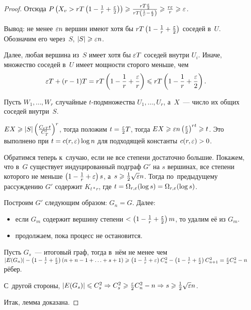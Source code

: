 \documentclass{article}
\begin{document}
\begin{proof}
	Отсюда $P\left(X_v > rT\left(1 - \frac{1}{r} + \frac{\varepsilon}{2}\right)\right)
	\geqslant \frac{rT \frac{\varepsilon}{2}}{rT \left(\frac{1}{r} - \frac{\varepsilon}{2}\right)}
	\geqslant \frac{r\varepsilon}{r} \geqslant \varepsilon$.

	Вывод: не менее $\varepsilon n$ вершин имеют хотя бы $rT\left(1 - \frac{1}{r} +
	\frac{\varepsilon}{2}\right)$ соседей в~$U$. Обозначим его через~$S$, $|S| \geqslant \varepsilon
	n$.

	Далее, любая вершина из~$S$ имеет хотя бы $\varepsilon T$ соседей внутри $U_i$.
	Иначе, множество соседей в~$U$ имеет мощности сторого меньше, чем
	$$ \varepsilon T + (r - 1) T = rT \left(1 - \frac{1}{r} + \frac{\varepsilon}{r}\right) \leqslant
	rT \left( 1 - \frac{1}{r} + \frac{\varepsilon}{2} \right).$$

	Пусть $W_1, \ldots, W_r$ случайные $t$-подмножества $U_1, \ldots, U_r$,
	а~$X$~--- число их общих соседей внутри~$S$.

	$ EX \geqslant |S| \left( \frac{C_{\varepsilon T}{t}}{C_T^t}\right)^r $, тогда положим $t =
	\frac{\varepsilon}{2}T$, тогда $EX \geqslant \varepsilon n \left(\frac{\varepsilon}{2}\right)^{rt} \geqslant
	t$. Это выполнено при $t = c(r, \varepsilon) \log n$ для подходящей константы $c(r,
	\varepsilon) > 0$.

	Обратимся теперь к~случаю, если не все степени достаточно большие. Покажем,
	что в~$G$ существует индуцированный подграф $G'$ на $s$ вершинах, все
	степени которого не меньше $\left(1 - \frac{1}{r} + \varepsilon\right)s$, а~$s \geqslant
	\frac{1}{2} \sqrt{\varepsilon} n$. Тогда по~предыдущему рассуждению $G'$ содержит
	$K_{t \ast r}$, где $t = \Omega_{r,\varepsilon}(\log s) = \Omega_{r,\varepsilon}(\log s)$.

	Построим $G'$ следующим образом: $G_n = G$. Далее:
	\begin{itemize}
		\item если $G_m$ содержит вершину степени $< \left( 1 - \frac{1}{r} +
			\frac{\varepsilon}{2}\right)m$, то удалим её из $G_m$.
		\item продолжаем, пока процесс не остановится.
	\end{itemize}

	Пусть $G_s$~--- итоговый граф, тогда в~нём не менее чем $|E(G_n)| -
	\left(1 - \frac{1}{r} + \frac{\varepsilon}{2}\right)(n + n - 1 + \ldots + s + 1)
	\geqslant \left(1 - \frac{1}{r} + \varepsilon\right) C_n^2 - \left( 1 - \frac{1}{r} +
	\frac{\varepsilon}{2}\right)C_{n+1}^2 = \frac{\varepsilon}{2} C_n^2 - n$ рёбер.

	С~другой стороны, $|E(G_s)| \leqslant C_s^2 \Rightarrow C_s^2 \geqslant
	\frac{\varepsilon}{2}C_n^2 - n \Rightarrow s \geqslant \frac{1}{2} \sqrt{\varepsilon} n$.

	Итак, лемма доказана.
\end{proof}
\end{document}
